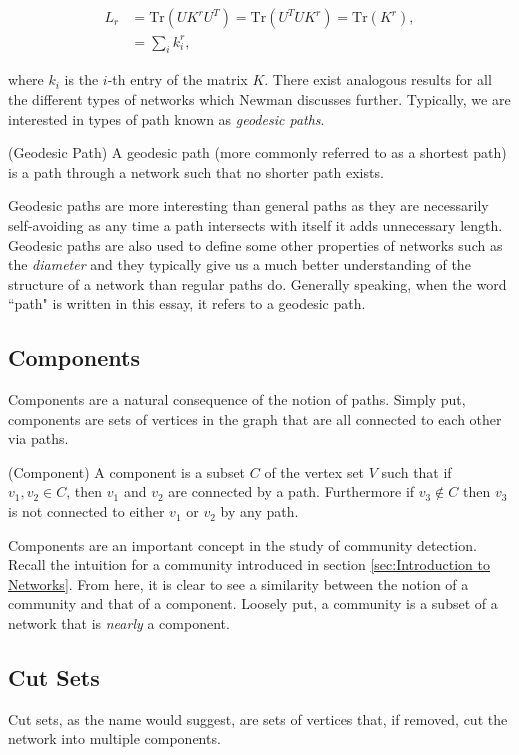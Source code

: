 $$
\begin{aligned}
    L_r &= \text{Tr}(UK^rU^T) = \text{Tr}(U^TUK^r) = \text{Tr}(K^r), \\
    & = \sum_i k_i^r,
\end{aligned}
$$

where $k_i$ is the $i$-th entry of the matrix $K$. There exist analogous results for all the different types of networks which Newman discusses further\cite[138]{newman10}. Typically, we are interested in types of path known as \emph{geodesic paths}.

\begin{definition}{(Geodesic Path)}
    A geodesic path (more commonly referred to as a shortest path) is a path through a network such that no shorter path exists.
\end{definition}

Geodesic paths are more interesting than general paths as they are necessarily self-avoiding as any time a path intersects with itself it adds unnecessary length. Geodesic paths are also used to define some other properties of networks such as the \emph{diameter} and they typically give us a much better understanding of the structure of a network than regular paths do. Generally speaking, when the word ``path" is written in this essay, it refers to a geodesic path.

\subsection{Components}
Components are a natural consequence of the notion of paths. Simply put, components are sets of vertices in the graph that are all connected to each other via paths.

\begin{definition}{(Component)}
    A component is a subset $C$ of the vertex set $V$ such that if $v_1, v_2 \in C$, then $v_1$ and $v_2$ are connected by a path. Furthermore if $v_3 \not\in C$ then $v_3$ is not connected to either $v_1$ or $v_2$ by any path.
\end{definition}

Components are an important concept in the study of community detection. Recall the intuition for a community introduced in section \ref{sec:Introduction to Networks}. From here, it is clear to see a similarity between the notion of a community and that of a component. Loosely put, a community is a subset of a network that is \emph{nearly} a component.

\subsection{Cut Sets}
Cut sets, as the name would suggest, are sets of vertices that, if removed, cut the network into multiple components. 

